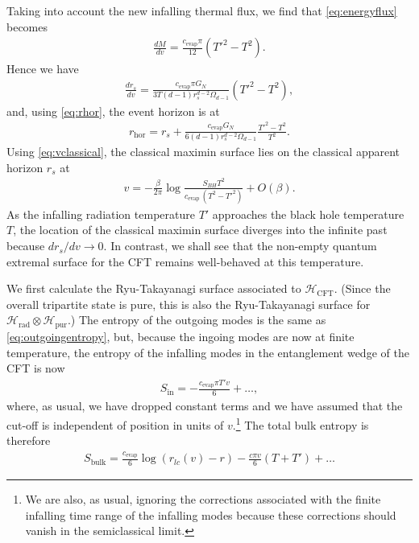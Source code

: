 \documentclass[12pt]{article}
\begin{document}
Taking into account the new infalling thermal flux, we find that \eqref{eq:energyflux} becomes
\begin{align}
\frac{d M}{d v} =\frac{c_\text{evap} \pi}{12} (T'^2 - T^2).
\end{align}
Hence we have
\begin{align} \label{eq:drsT'}
\frac{d r_s}{d v} = \frac{c_\text{evap} \pi G_N}{3 T(d-1) r_s^{d-2} \Omega_{d-1}}(T'^2 - T^2),
\end{align}
and, using \eqref{eq:rhor}, the event horizon is at
\begin{align}
r_\text{hor} = r_s + \frac{c_\text{evap} G_N}{6 (d-1) r_s^{d-2} \Omega_{d-1}}\frac{T'^2 - T^2}{T^2}.
\end{align}
Using \eqref{eq:vclassical}, the classical maximin surface lies on the classical apparent horizon $r_s$ at
\begin{align}
v =  -\frac{\beta}{2 \pi} \log \frac{S_{BH}T^2}{c_\text{evap} \,(T^2 - T'^2)} + O(\beta).
\end{align}
As the infalling radiation temperature $T'$ approaches the black hole temperature $T$, the location of the classical maximin surface diverges into the infinite past because $d r_s/d v \to 0$. In contrast, we shall see that the non-empty quantum extremal surface for the CFT remains well-behaved at this temperature.

We first calculate the Ryu-Takayanagi surface associated to $\mathcal{H}_\text{CFT}$. (Since the overall tripartite state is pure, this is also the Ryu-Takayanagi surface for $\mathcal{H}_\text{rad} \otimes \mathcal{H}_\text{pur}$.) The entropy of the outgoing modes is the same as \eqref{eq:outgoingentropy}, but, because the ingoing modes are now at finite temperature, the entropy of the infalling modes in the entanglement wedge of the CFT is now
\begin{align} \label{eq:dSindv}
S_\text{in} = - \frac{c_\text{evap} \pi  T' v}{6} + \dots,
\end{align}
where, as usual, we have dropped constant terms and we have assumed that the cut-off is independent of position in units of $v$.\footnote{We are also, as usual, ignoring the corrections associated with the finite infalling time range of the infalling modes because these corrections should vanish in the semiclassical limit.} The total bulk entropy is therefore
\begin{align} \label{eq:outgoingentropyT'}
S_\text{bulk} = \frac{c_\text{evap}}{6}\log\left(r_{lc}(v) - r\right) - \frac{c\pi v}{6}(T+T') + \dots
\end{align}
\end{document}

